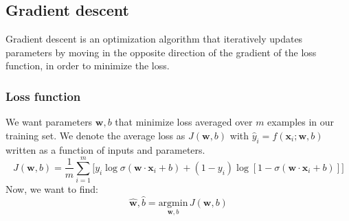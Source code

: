\documentclass[11pt]{article}
\begin{document}
\subsection{Gradient descent}
\begin{definition}
Gradient descent is an optimization algorithm that iteratively updates parameters by moving in the opposite direction of the gradient of the loss function, in order to minimize the loss.
\end{definition}
\subsubsection{Loss function}
We want parameters $\mathbf{w},b$ that minimize loss averaged over $m$ examples in our training set. We denote the average loss as $J(\mathbf{w},b)$ with $\hat{y}_i=f(\mathbf{x}_i;\mathbf{w},b)$ written as a function of inputs and parameters.
$$
J(\mathbf{w},b)=\frac{1}{m}\sum_{i=1}^{m}\big[y_i\log\sigma(\mathbf{w}\cdot\mathbf{x}_i+b)+(1-y_i)\log[1-\sigma(\mathbf{w}\cdot\mathbf{x}_i+b)]\big]
$$
Now, we want to find:
$$
\hat{\mathbf{w}},\hat{b}=\underset{\mathbf{w},b}{\text{argmin}}\hspace{2pt}J(\mathbf{w},b)
$$
\end{document}
